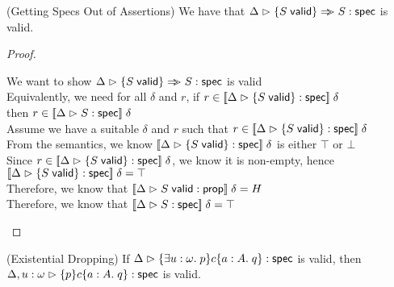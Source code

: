 \begin{lemma}{(Getting Specs Out of Assertions)}
We have that $\judgeS{\setof{\validprop{S}} \specimp S}$ is valid.
\end{lemma}
\begin{proof}
  \begin{tabbedproof}
    \oo We want to show $\judgeS{\setof{\validprop{S}} \specimp S}$ is valid \\
    \oo Equivalently, we need for all $\delta$ and $r$, if $r \in \interp{\judgeS{\setof{\validprop{S}}}}\;\delta$\\
    \ox    then $r \in \interp{\judgeS{S}}\;\delta$ \\
    \oo Assume we have a suitable $\delta$ and $r$ such that $r \in \interp{\judgeS{\setof{\validprop{S}}}}\;\delta$ \\
    \ooo From the semantics, we know $\interp{\judgeS{\setof{\validprop{S}}}}\;\delta$ is either $\top$ or $\bot$ \\
    \ooo Since $r \in \interp{\judgeS{\setof{\validprop{S}}}}\;\delta$, we know it is non-empty, hence \\
    \ooox $\interp{\judgeS{\setof{\validprop{S}}}}\;\delta = \top$ \\
    \ooo Therefore, we know that $\interp{\judgeA{\validprop{S}}{\assert}}\;\delta = H$ \\
    \ooo Therefore, we know that $\interp{\judgeS{S}}\;\delta = \top$ \\
  \end{tabbedproof}
\end{proof}

\begin{lemma}{(Existential Dropping)}
If $\judgeS{\spec{\exists u:\omega.\;p}{c}{a:A}{q}}$ is valid, then 
   $\judgeS[\Delta, u:\omega]{\spec{p}{c}{a:A}{q}}$ is valid. 
\end{lemma}

